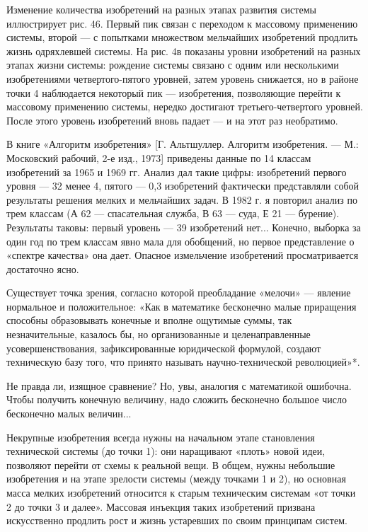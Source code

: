 Изменение  количества изобретений  на разных  этапах развития  системы
иллюстрирует  рис.  46. Первый  пик  связан  с переходом  к  массовому
применению  системы,  второй  —   с  попытками  множеством  мельчайших
изобретений продлить  жизнь одряхлевшей  системы. На рис.  4в показаны
уровни изобретений  на разных  этапах жизни системы:  рождение системы
связано  с  одним   или  несколькими  изобретениями  четвертого-пятого
уровней,  затем уровень  снижается, но  в районе  точки 4  наблюдается
некоторый  пик   —  изобретения,   позволяющие  перейти   к  массовому
применению  системы,  нередко достигают  третьего-четвертого  уровней.
После  этого  уровень  изобретений  вновь  падает  —  и  на  этот  раз
необратимо.

В книге «Алгоритм изобретения» [Г. Альтшуллер. Алгоритм изобретения. —
М.: Московский рабочий, 2-е изд., 1973] приведены данные по 14 классам
изобретений за  1965 и  1969 гг. Анализ  дал такие  цифры: изобретений
первого  уровня —  32%
менее 4,  пятого — 0,3%
изобретений фактически представляли собой  результаты решения мелких и
мельчайших задач. В 1982 г. я повторил  анализ по трем классам (А 62 —
спасательная служба, В 63 — суда,  Е 21 — бурение). Результаты таковы:
первый уровень — 39%
изобретений нет... Конечно,  выборка за один год по  трем классам явно
мала для обобщений,  но первое представление о  «спектре качества» она
дает. Опасное измельчение изобретений просматривается достаточно ясно.

Существует  точка зрения,  согласно  которой  преобладание «мелочи»  —
явление нормальное и положительное: «Как в математике бесконечно малые
приращения способны образовывать конечные и вполне ощутимые суммы, так
незначительные,  казалось  бы,  но организованные  и  целенаправленные
усовершенствования,  зафиксированные   юридической  формулой,  создают
техническую  базу   того,  что  принято   называть  научно-технической
революцией»*.


Не  правда ли,  изящное  сравнение? Но,  увы,  аналогия с  математикой
ошибочна. Чтобы  получить конечную  величину, надо  сложить бесконечно
большое число бесконечно малых величин...

Некрупные  изобретения всегда  нужны  на  начальном этапе  становления
технической системы (до  точки 1): они наращивают  «плоть» новой идеи,
позволяют перейти от  схемы к реальной вещи. В  общем, нужны небольшие
изобретения и  на этапе  зрелости системы  (между точками  1 и  2), но
основная  масса  мелких  изобретений относится  к  старым  техническим
системам «от  точки 2  до точки  3 и  далее». Массовая  инъекция таких
изобретений призвана искусственно продлить  рост и жизнь устаревших по
своим принципам систем.

